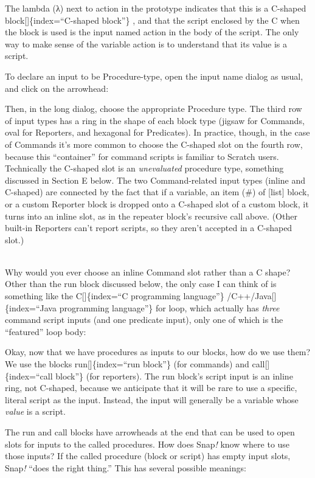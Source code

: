 \documentclass[
  letterpaper,
]{book}
\begin{document}
The lambda (λ) next to action in the prototype indicates that this is a
C-shaped block{[}{]}\{index=``C-shaped block''\} , and that the script
enclosed by the C when the block is used is the input named action in
the body of the script. The only way to make sense of the variable
action is to understand that its value is a script.

To declare an input to be Procedure-type, open the input name dialog as
usual, and click on the arrowhead:

Then, in the long dialog, choose the appropriate Procedure type. The
third row of input types has a ring in the shape of each block type
(jigsaw for Commands, oval for Reporters, and hexagonal for Predicates).
In practice, though, in the case of Commands it's more common to choose
the C-shaped slot on the fourth row, because this ``container'' for
command scripts is familiar to Scratch users. Technically the C-shaped
slot is an \emph{unevaluated} procedure type, something discussed in
Section E below. The two Command-related input types (inline and
C-shaped) are connected by the fact that if a variable, an item (\#) of
{[}list{]} block, or a custom Reporter block is dropped onto a C-shaped
slot of a custom block, it turns into an inline slot, as in the repeater
block's recursive call above. (Other built-in Reporters can't report
scripts, so they aren't accepted in a C-shaped slot.)

\strut \\
Why would you ever choose an inline Command slot rather than a C shape?
Other than the run block discussed below, the only case I can think of
is something like the C{[}{]}\{index=``C programming language''\}
/C++/Java{[}{]}\{index=``Java programming language''\} for loop, which
actually has \emph{three} command script inputs (and one predicate
input), only one of which is the ``featured'' loop body:

Okay, now that we have procedures as inputs to our blocks, how do we use
them? We use the blocks run{[}{]}\{index=``run block''\} (for commands)
and call{[}{]}\{index=``call block''\} (for reporters). The run block's
script input is an inline ring, not C-shaped, because we anticipate that
it will be rare to use a specific, literal script as the input. Instead,
the input will generally be a variable whose \emph{value} is a script.

The run and call blocks have arrowheads at the end that can be used to
open slots for inputs to the called procedures. How does Snap\emph{!}
know where to use those inputs? If the called procedure (block or
script) has empty input slots, Snap\emph{!} ``does the right thing.''
This has several possible meanings:
\end{document}
